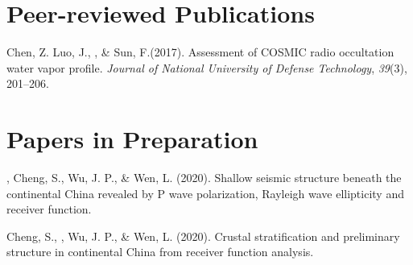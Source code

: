 \newcommand{\Revision}{\textit{under revision}}
\newcommand{\CS}{*} %
\newcommand{\CF}{\textsuperscript{\#}} %


\section*{Peer-reviewed Publications}

\begin{etaremune}
\item
    Chen, Z. Luo, J.,  \Xiao, \& Sun, F.(2017).
    Assessment of COSMIC radio occultation water vapor profile.
    \textit{Journal of National University of Defense Technology}, \textit{39}(3), 201--206.
\end{etaremune}


\section*{Papers in Preparation}
\begin{etaremune}
\item
    \Xiao, Cheng, S., Wu, J. P., \& Wen, L. (2020).
    Shallow seismic structure beneath the continental China revealed by P wave polarization, Rayleigh wave ellipticity and receiver function.
\item
    Cheng, S., \Xiao, Wu, J. P., \& Wen, L. (2020).
    Crustal stratification and preliminary structure in continental China from receiver function analysis. 
\end{etaremune}

